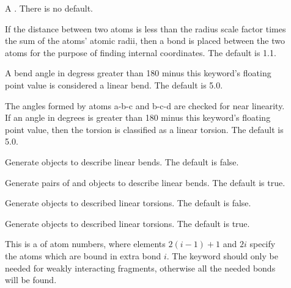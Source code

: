 \begin{description}
  \item[] A 
    .  There is no default.

  \item[] If the distance between two atoms is
      less than the radius scale factor times the sum of the atoms' atomic
      radii, then a bond is placed between the two atoms for the purpose of
      finding internal coordinates.  The default is 1.1.

  \item[] A bend angle in degress greater
      than 180 minus this keyword's floating point value is considered a
      linear bend. The default is 5.0.

  \item[] The angles formed by atoms a-b-c
      and b-c-d are checked for near linearity.  If an angle in degrees is
      greater than 180 minus this keyword's floating point value, then the
      torsion is classified as a linear torsion. The default is 5.0.

  \item[] Generate  objects
      to describe linear bends.  The default is false.

  \item[] Generate pairs of 
      and  objects to describe linear bends.  The
      default is true.

  \item[] Generate  objects
      to described linear torsions.  The default is false.

  \item[] Generate 
      objects to described linear torsions.  The default is true.


  \item[] This is a  of atom
     numbers, where elements $2 (i-1) + 1$ and $2 i$ specify the atoms
     which are bound in extra bond $i$.  The  keyword
     should only be needed for weakly interacting fragments, otherwise all
     the needed bonds will be found.

\end{description}

